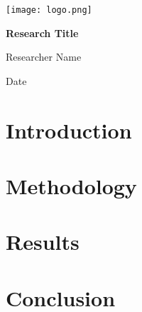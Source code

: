 \documentclass{article}
\begin{document}
\begin{titlepage}
    \centering
    \vspace*{2cm}
    \texttt{[image: logo.png]} %
    \vspace{2cm}
    {\Huge\bfseries Research Title\par}
    \vspace{1cm}
    {\Large Researcher Name\par}
    \vspace{1cm}
    {\large Date\par}
    \vfill
\end{titlepage}

\tableofcontents

\newpage

\section{Introduction}
\lipsum[1-2]

\section{Methodology}
\lipsum[3-4]

\section{Results}
\lipsum[5-6]

\section{Conclusion}
\lipsum[7]
\end{document}
